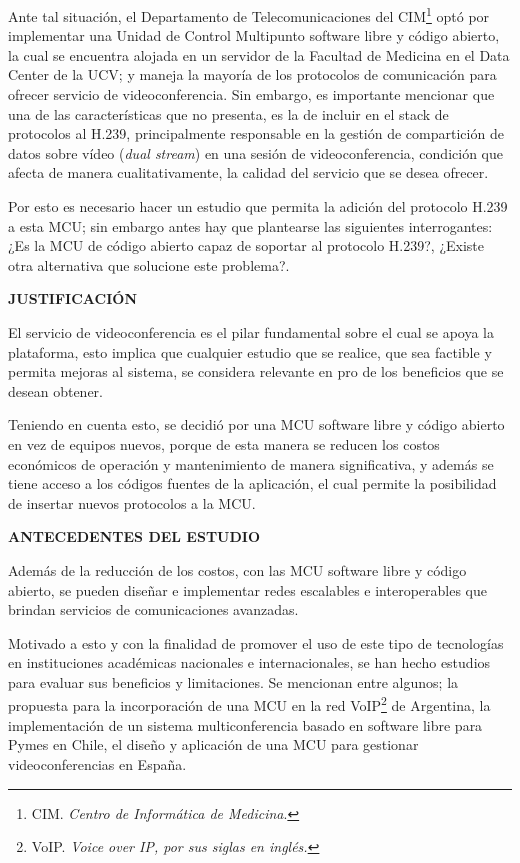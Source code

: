\documentclass[12pt,letterpaper]{article}
\begin{document}
Ante tal situación, el Departamento de Telecomunicaciones del CIM\footnote{CIM. \emph{Centro de Informática de Medicina}.} optó por implementar una Unidad de Control Multipunto software libre y código abierto, la cual se encuentra alojada en un servidor de la Facultad de Medicina en el Data Center de la UCV; y maneja la mayoría de los protocolos de comunicación para ofrecer servicio de videoconferencia. Sin embargo, es importante mencionar que una de las características que no presenta, es la de incluir en el stack de protocolos al H.239, principalmente responsable en la gestión de compartición de datos sobre vídeo (\emph{dual stream}) en una sesión de videoconferencia, condición que afecta de manera cualitativamente, la calidad del servicio que se desea ofrecer.

Por esto es necesario hacer un estudio que permita la adición del protocolo H.239 a esta MCU; sin embargo antes hay que plantearse las siguientes interrogantes: ¿Es la MCU de código abierto capaz de soportar al protocolo H.239?, ¿Existe otra alternativa que solucione este problema?.        

\centerline{\textbf{JUSTIFICACIÓN}}

El servicio de videoconferencia es el pilar fundamental sobre el cual se apoya la plataforma, esto implica que cualquier estudio que se realice, que sea factible y permita mejoras al sistema, se considera relevante en pro de los beneficios que se desean obtener.

Teniendo en cuenta esto, se decidió por una MCU software libre y código abierto en vez de equipos nuevos, porque de esta manera se reducen los costos económicos de operación y mantenimiento de manera significativa, y además se tiene acceso a los códigos fuentes de la aplicación, el cual permite la posibilidad de insertar nuevos protocolos a la MCU. 

\centerline{\textbf{ANTECEDENTES DEL ESTUDIO}}

Además de la reducción de los costos, con las MCU software libre y código abierto, se pueden diseñar e implementar redes escalables e interoperables que brindan servicios de comunicaciones avanzadas. 

Motivado a esto y con la finalidad de promover el uso de este tipo de tecnologías en instituciones académicas nacionales e internacionales, se han hecho estudios para evaluar sus beneficios y limitaciones. Se mencionan entre algunos; la propuesta para la incorporación de una MCU en la red VoIP\footnote{VoIP. \emph{Voice over IP, por sus siglas en inglés.}} de Argentina\cite{VoIP}, la implementación de un sistema multiconferencia basado en software libre\cite{inacap} para Pymes en Chile, el diseño y aplicación de una MCU para gestionar videoconferencias\cite{MCUAD} en España. 
\end{document}
